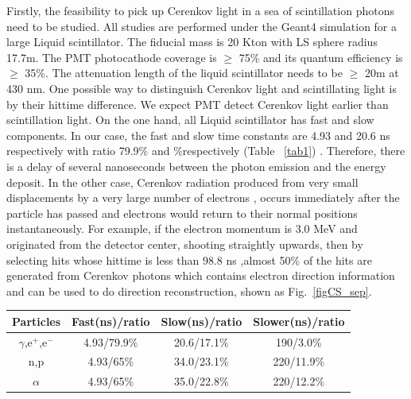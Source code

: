 \documentclass[a4paper,10pt]{cpc-hepnp}
\begin{document}
Firstly, the feasibility to pick up Cerenkov light in a sea of scintillation photons
need to be studied.
All studies are performed under the Geant4 simulation for a large Liquid
scintillator.
The fiducial mass is 20 Kton with LS sphere radius 17.7m.
The PMT photocathode coverage is $\ge$ 75\% and its
quantum efficiency is
$\ge$ 35\%. The attenuation length of the liquid scintillator needs to be $\ge$ 20m at 430 nm.
One possible way to distinguish Cerenkov light and scintillating light is by their hittime
difference\cite{lab2}. We expect PMT detect Cerenkov light earlier than scintillation light.
On the one hand, all Liquid scintillator has fast and slow components. In our
case, the fast and slow time constants are 4.93 and 20.6 ns respectively with
ratio  79.9\% and \%respectively (Table ~\ref{tab1}) .
Therefore, there is a delay of several nanoseconds between the photon emission and the energy deposit.
In the other case, Cerenkov radiation produced from very small displacements by a very large number of electrons
, occurs immediately after the particle has passed and electrons would return to their normal positions
 instantaneously\cite{special_article}.
For example, if the electron momentum is 3.0 MeV and originated
from the detector center, shooting straightly upwards, then by selecting hits whose hittime is less than 98.8 ns ,almost 50\% of
the hits are generated from Cerenkov photons which contains electron direction
information and can be used to do direction reconstruction, shown as Fig.~\ref{figCS_sep}.
\begin{center}
\footnotesize
\begin{tabular*}{100mm}{@{\extracolsep{\fill}}cccc}
\toprule Particles & Fast(ns)/ratio & Slow(ns)/ratio &Slower(ns)/ratio \\
\hline
$\gamma$,e$^+$,e$^-$&4.93/79.9\%&20.6/17.1\%&190/3.0\% \\
n,p&4.93/65\%&34.0/23.1\%&220/11.9\% \\
$\alpha$&4.93/65\%&35.0/22.8\%&220/12.2\%\\
\bottomrule
\end{tabular*}
\end{center}
\end{document}

